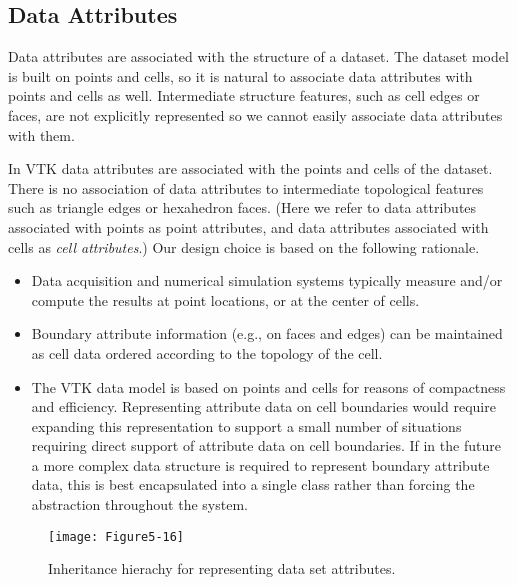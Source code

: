 \subsection{Data Attributes}

Data attributes are associated with the structure of a dataset. The dataset model is built on points and cells, so it is natural to associate data attributes with points and cells as well. Intermediate structure features, such as cell edges or faces, are not explicitly represented so we cannot easily associate data attributes with them.

In VTK data attributes are associated with the points and cells of the dataset. There is no association of data attributes to intermediate topological features such as triangle edges or hexahedron faces. (Here we refer to data attributes associated with points as point attributes, and data attributes associated with cells as \emph{cell attributes}.) Our design choice is based on the following rationale.

\begin{itemize}

	\item Data acquisition and numerical simulation systems typically measure and/or compute the results at point locations, or at the center of cells.

	\item Boundary attribute information (e.g., on faces and edges) can be maintained as cell data ordered according to the topology of the cell.

	\item The VTK data model is based on points and cells for reasons of compactness and efficiency. Representing attribute data on cell boundaries would require expanding this representation to support a small number of situations requiring direct support of attribute data on cell boundaries. If in the future a more complex data structure is required to represent boundary attribute data, this is best encapsulated into a single class rather than forcing the abstraction throughout the system.

\end{itemize}
\begin{figure}[!htb]
	\centering
	\texttt{[image: Figure5-16]}
	\caption{Inheritance hierachy for representing data set attributes.}
	\label{fig:Figure5-16}
\end{figure}


